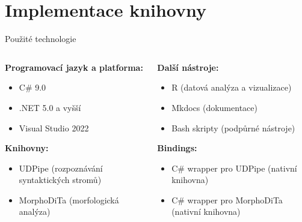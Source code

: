 \documentclass[lualatex,hyperref={pdfencoding=auto}]{beamer}
\begin{document}
\section{Implementace knihovny}
\begin{frame}{Použité technologie}
    \begin{columns}[t] 
        \begin{column}{0.5\textwidth}
            \vspace{0pt} %
            \textbf{Programovací jazyk a platforma:}
            \begin{itemize}
                \item C\# 9.0
                \item .NET 5.0 a vyšší
                \item Visual Studio 2022
            \end{itemize}
            \vspace{12pt}
            \textbf{Knihovny:}
            \begin{itemize}
                \item UDPipe 
                (rozpoznávání syntaktických stromů) \nocite{udpipe:2017}
                \item MorphoDiTa (morfologická analýza) \nocite{strakova14}
            \end{itemize}
        \end{column}
        \begin{column}{0.5\textwidth}
            \vspace{0pt} %
            \textbf{Další nástroje:}
            \begin{itemize}
                \item R (datová analýza a vizualizace)
                \item Mkdocs (dokumentace)
                \item Bash skripty (podpůrné nástroje)
            \end{itemize}
            
            \textbf{Bindings:}
            \begin{itemize}
                \item C\# wrapper pro UDPipe (nativní knihovna) 
                \item C\# wrapper pro MorphoDiTa (nativní knihovna) 
            \end{itemize}
        \end{column}
    \end{columns}
\end{frame}
\end{document}
